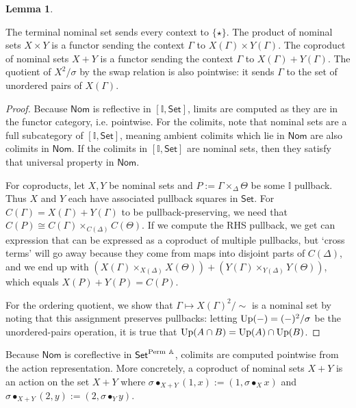 \documentclass{article}
\makeatletter
\newcommand{\allproofs}{} %
\newif\ifproofsinappendix
\newcommand{\lemmawithproof}[3]{%
  \begin{lemma}\label{#1}
    #2  
    \ifproofsinappendix \hyperref[xxx#1]{(Proof)} \fi
  \end{lemma}
    \ifproofsinappendix
  \g@addto@macro\allproofs{%
    \par\medskip
    \noindent
    \subsection*{\cref{#1}}\par
    #2\par
    \begin{proof}\label{xxx#1}
      #3
    \end{proof}%
  }
      \else

    \begin{proof}
      #3
    \end{proof}
    \fi 
}
\theoremstyle{definition}
\newtheorem{lemma}{Lemma}[section]
\newcommand{\A}{\mathbb{A}}
\newcommand{\II}{\mathbb{I}}
\newcommand{\cat}[1]{\mathsf{#1}}
\newcommand{\Set}{\cat{Set}}
\newcommand{\Nom}{\cat{Nom}}
\makeatother
\begin{document}
\lemmawithproof{lemma:limcolim}{    
    The terminal nominal set sends every context to $\{\star\}$. 
    The product of nominal sets $X\times Y$ is a functor sending the context $\Gamma$ to $X(\Gamma)\times Y(\Gamma)$. 
    The coproduct of nominal sets $X+Y$ is a functor sending the context $\Gamma$ to $X(\Gamma)+ Y(\Gamma)$. The quotient of $X^2/\sigma$ by the swap relation is also pointwise: it sends $\Gamma$ to the set of unordered pairs of $X(\Gamma)$.
}{
Because $\Nom$ is reflective in $[\II,\Set]$, limits are computed as they are in the functor category, i.e. pointwise. 
For the colimits, note that nominal sets are a full subcategory of $[\II,\Set]$, meaning ambient colimits which lie in $\Nom$ are also colimits in $\Nom$. 
If the colimits in $[\II,\Set]$ are nominal sets, then they satisfy that universal property in $\Nom$. 
    
For coproducts, let $X,Y$ be nominal sets and $P:=\Gamma \times_\Delta \Theta$ be some $\II$ pullback. Thus $X$ and $Y$ each have associated pullback squares in $\Set$. 
For $C(\Gamma)=X(\Gamma)+Y(\Gamma)$ to be pullback-preserving, we need that $C(P)\cong C(\Gamma)\times_{C(\Delta)} C(\Theta)$. 
If we compute the RHS pullback, we get can expression that can be expressed as a coproduct of multiple pullbacks, but `cross terms' will go away because they come from maps into disjoint parts of $C(\Delta)$, and we end up with $(X(\Gamma)\times_{X(\Delta)} X(\Theta)) + (Y(\Gamma)\times_{Y(\Delta)} Y(\Theta))$, which equals $X(P)+Y(P)=C(P)$. 

For the ordering quotient, we show that $\Gamma \mapsto X(\Gamma)^2/\sim$ is a nominal set by noting that this assignment preserves pullbacks: 
letting ${\rm Up}(-)=(-)^2/\sigma$ be the unordered-pairs operation, it is true that ${\rm Up}(A\cap B) = {\rm Up}(A) \cap {\rm Up}(B)$.

}

Because $\Nom$ is coreflective in $\Set^{\rm Perm\ \A}$, colimits are computed pointwise from the action representation. More concretely, a coproduct of nominal sets $X+Y$ is an action on the set $X+Y$ where $\sigma \bullet_{X+Y} (1,x) := (1,\sigma \bullet_X x)$ and $\sigma \bullet_{X+Y} (2,y) := (2, \sigma \bullet_Y y)$. 


\end{document}
